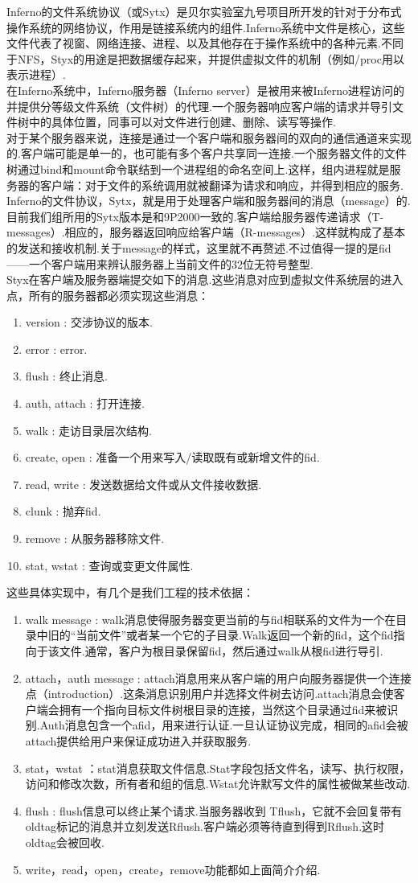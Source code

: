\documentclass[paper=a4]{ctexart} %
\numberwithin{equation}{section} %
\numberwithin{figure}{section} %
\numberwithin{table}{section} %
\newcommand{\n}{\\\indent}
\begin{document}
Inferno的文件系统协议（或Sytx）是贝尔实验室九号项目所开发的针对于分布式操作系统的网络协议，作用是链接系统内的组件.Inferno系统中文件是核心，这些文件代表了视窗、网络连接、进程、以及其他存在于操作系统中的各种元素.不同于NFS，Styx的用途是把数据缓存起来，并提供虚拟文件的机制（例如/proc用以表示进程）.\n
在Inferno系统中，Inferno服务器（Inferno server）是被用来被Inferno进程访问的并提供分等级文件系统（文件树）的代理.一个服务器响应客户端的请求并导引文件树中的具体位置，同事可以对文件进行创建、删除、读写等操作.\n
对于某个服务器来说，连接是通过一个客户端和服务器间的双向的通信通道来实现的.客户端可能是单一的，也可能有多个客户共享同一连接.一个服务器文件的文件树通过bind和mount命令联结到一个进程组的命名空间上.这样，组内进程就是服务器的客户端：对于文件的系统调用就被翻译为请求和响应，并得到相应的服务.\n 
      Inferno的文件协议，Sytx，就是用于处理客户端和服务器间的消息（message）的.目前我们组所用的Sytx版本是和9P2000一致的.客户端给服务器传递请求（T-messages）.相应的，服务器返回响应给客户端（R-messages）.这样就构成了基本的发送和接收机制.关于message的样式，这里就不再赘述.不过值得一提的是fid——一个客户端用来辨认服务器上当前文件的32位无符号整型.\n 
      Styx在客户端及服务器端提交如下的消息.这些消息对应到虚拟文件系统层的进入点，所有的服务器都必须实现这些消息：
\begin{enumerate}
\item version : 交涉协议的版本.
\item error : error.
\item flush : 终止消息.
\item auth, attach : 打开连接.
\item walk : 走访目录层次结构.
\item create, open : 准备一个用来写入/读取既有或新增文件的fid.
\item read, write : 发送数据给文件或从文件接收数据.
\item clunk : 抛弃fid.
\item remove : 从服务器移除文件.
\item stat, wstat : 查询或变更文件属性.
\end{enumerate}
这些具体实现中，有几个是我们工程的技术依据：
\begin{enumerate}
\item walk message : walk消息使得服务器变更当前的与fid相联系的文件为一个在目录中旧的“当前文件”或者某一个它的子目录.Walk返回一个新的fid，这个fid指向于该文件.通常，客户为根目录保留fid，然后通过walk从根fid进行导引.
\item attach，auth message : attach消息用来从客户端的用户向服务器提供一个连接点（introduction）.这条消息识别用户并选择文件树去访问.attach消息会使客户端会拥有一个指向目标文件树根目录的连接，当然这个目录通过fid来被识别.Auth消息包含一个afid，用来进行认证.一旦认证协议完成，相同的afid会被attach提供给用户来保证成功进入并获取服务.
\item stat，wstat ：stat消息获取文件信息.Stat字段包括文件名，读写、执行权限，访问和修改次数，所有者和组的信息.Wstat允许默写文件的属性被做某些改动.
\item flush : flush信息可以终止某个请求.当服务器收到 Tflush，它就不会回复带有oldtag标记的消息并立刻发送Rflush.客户端必须等待直到得到Rflush.这时oldtag会被回收.
\item write，read，open，create，remove功能都如上面简介介绍.
\end{enumerate}
\end{document}

